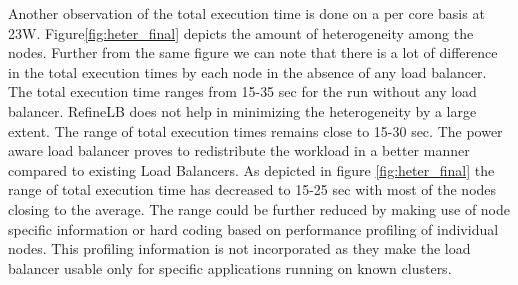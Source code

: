 Another observation of the total execution time is done on a per core basis at
23W. Figure\ref{fig:heter_final} depicts the amount of heterogeneity among the
nodes. Further from the same figure we can note that there is a lot of
difference in the total execution times by each node in the absence of any load
balancer. The total execution time ranges from 15-35 sec for the run without
any load balancer. RefineLB does not help in minimizing the heterogeneity by a
large extent. The range of total execution times remains close to 15-30 sec.
The power aware load balancer proves to redistribute the workload in a better
manner compared to existing Load Balancers.  As depicted in figure
\ref{fig:heter_final} the range of total execution time has decreased to 15-25
sec with most of the nodes closing to the average. The range could be further
reduced by making use of node specific information or hard coding based on
performance profiling of individual nodes. This profiling information is not
incorporated as they make the load balancer usable only for specific
applications running on known clusters.
